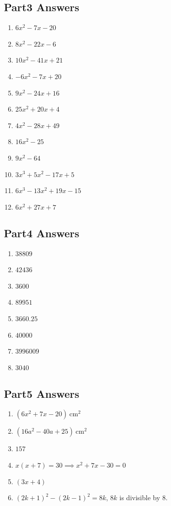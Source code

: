 \documentclass[12pt,a4paper]{article}
\begin{document}
	\subsection*{Part3 Answers}
	\begin{enumerate}
		\item $6x^2-7x-20$
		\item $8x^2-22x-6$
		\item $10x^2-41x+21$
		\item $-6x^2-7x+20$
		\item $9x^2-24x+16$
		\item $25x^2+20x+4$
		\item $4x^2-28x+49$
		\item $16x^2-25$
		\item $9x^2-64$
		\item $3x^3+5x^2-17x+5$
		\item $6x^3-13x^2+19x-15$
		\item $6x^2+27x+7$
	\end{enumerate}
	\subsection*{Part4 Answers}
	\begin{enumerate}
		\item $38809$
		\item $42436$
		\item $3600$
		\item $89951$
		\item $3660.25$
		\item $40000$
		\item $3996009$
		\item $3040$
	\end{enumerate}
	\subsection*{Part5 Answers}
	\begin{enumerate}
		\item $(6x^2+7x-20)\ \mathrm{cm^2}$
		\item $(16a^2-40a+25)\ \mathrm{cm^2}$
		\item $157$
		\item $x(x+7)=30 \implies x^2+7x-30=0$
		\item $(3x+4)$
		\item $(2k+1)^2-(2k-1)^2=8k$, $8k$ is divisible by $8$.
	\end{enumerate}
\end{document}
